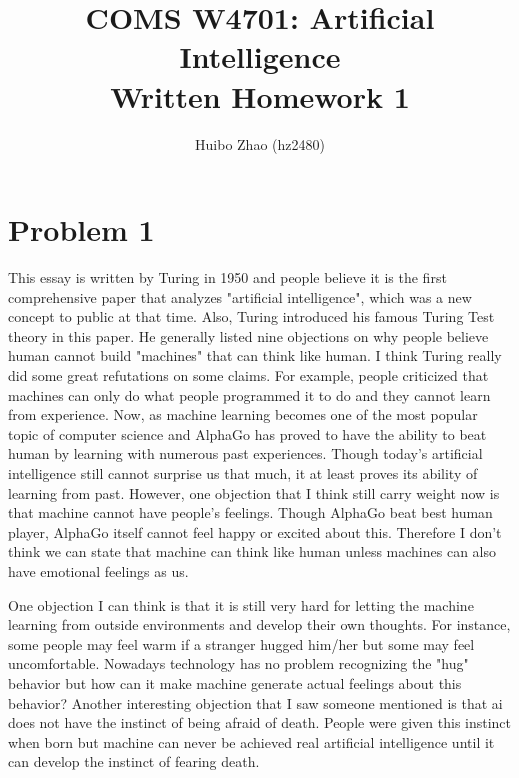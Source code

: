 \documentclass[11pt]{article}
\begin{document}
 
 
\title{COMS W4701: Artificial Intelligence\\
       Written Homework 1}
\author{Huibo Zhao (hz2480)} %
\maketitle

\section*{Problem 1} 
 


This essay is written by Turing in 1950 and people believe it is the first comprehensive paper that analyzes "artificial intelligence", which was a new concept to public at that time. Also, Turing introduced his famous Turing Test theory in this paper. He generally listed nine objections on why people believe human cannot build "machines" that can think like human. I think Turing really did some great refutations on some claims. For example, people criticized that machines can only do what people programmed it to do and they cannot learn from experience. Now, as machine learning becomes one of the most popular topic of computer science and AlphaGo has proved to have the ability to beat human by learning with numerous past experiences. Though today's artificial intelligence still cannot surprise us that much, it at least proves its ability of learning from past. However, one objection that I think still carry weight now is that machine cannot have people's feelings. Though AlphaGo beat best human player, AlphaGo itself cannot feel happy or excited about this. Therefore I don't think we can state that machine can think like human unless machines can also have emotional feelings as us. \newline

One objection I can think is that it is still very hard for letting the machine learning from outside environments and develop their own thoughts. For instance, some people may feel warm if a stranger hugged him/her but some may feel uncomfortable. Nowadays technology has no problem recognizing the "hug" behavior but how can it make machine generate actual feelings about this behavior? Another interesting objection that I saw someone mentioned is that ai does not have the instinct of being afraid of death. People were given this instinct when born but machine can never be achieved real artificial intelligence until it can develop the instinct of fearing death.
\end{document}
